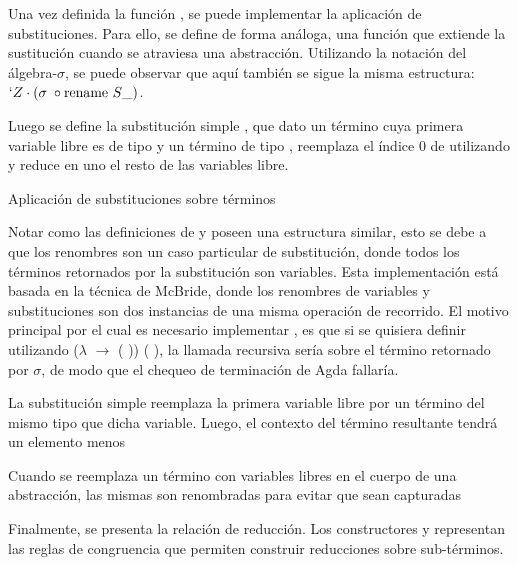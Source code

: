 Una vez definida la función , se puede implementar la aplicación de substituciones.
Para ello, se define de forma análoga, una función  que extiende la sustitución cuando se atraviesa una abstracción.
Utilizando la notación del álgebra-$\sigma$, se puede observar que aquí también se sigue la misma estructura: $`Z \cdot (\sigma \; \circ \text{rename } S\_)$.

Luego se define la substitución simple \func{$\_[\_]$}, que dato un término  cuya primera variable libre es de tipo  y un término  de tipo , reemplaza el índice 0 de  utilizando  y reduce en uno el resto de las variables libre.

\begin{codigo}
	Aplicación de substituciones sobre términos
\end{codigo}

Notar como las definiciones de  y  poseen una estructura similar, esto se debe a que los renombres son un caso particular de substitución, donde todos los términos retornados por la substitución son variables.
Esta implementación está basada en la técnica de McBride\cite{ren-sub}, donde los renombres de variables y substituciones son dos instancias de una misma operación de recorrido.
El motivo principal por el cual es necesario implementar , es que si se quisiera definir  utilizando  ($\lambda$  $\rightarrow$  ( )) (\bound{$\sigma$} ), la llamada recursiva sería sobre el término retornado por $\sigma$, de modo que el chequeo de terminación de Agda fallaría.

\begin{example}
	La substitución simple reemplaza la primera variable libre por un término del mismo tipo que dicha variable.
	Luego, el contexto del término resultante tendrá un elemento menos
\end{example}
\begin{example}
	Cuando se reemplaza un término con variables libres en el cuerpo de una abstracción, las mismas son renombradas para evitar que sean capturadas
\end{example}

Finalmente, se presenta la relación de reducción.
Los constructores \const{$\xi$} y \const{$\zeta$} representan las reglas de congruencia que permiten construir reducciones sobre sub-términos.

